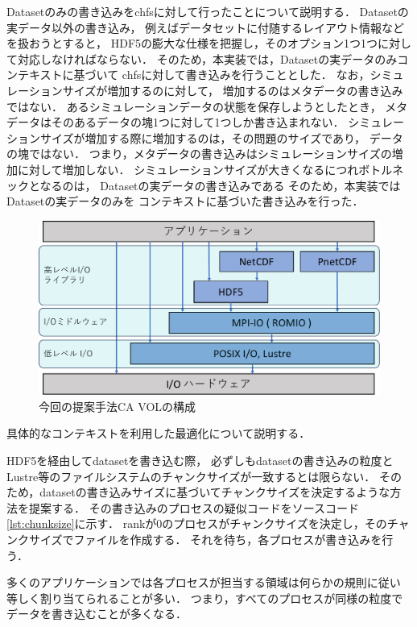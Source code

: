 \documentclass[submit,techrep,noauthor]{ipsj}
\begin{document}
Datasetのみの書き込みをchfsに対して行ったことについて説明する．
Datasetの実データ以外の書き込み，
例えばデータセットに付随するレイアウト情報などを扱おうとすると，
HDF5の膨大な仕様を把握し，そのオプション1つ1つに対して対応しなければならない．
そのため，本実装では，Datasetの実データのみコンテキストに基づいて
chfsに対して書き込みを行うこととした．
なお，シミュレーションサイズが増加するのに対して，
増加するのはメタデータの書き込みではない．
あるシミュレーションデータの状態を保存しようとしたとき，
メタデータはそのあるデータの塊1つに対して1つしか書き込まれない．
シミュレーションサイズが増加する際に増加するのは，その問題のサイズであり，
データの塊ではない．
つまり，メタデータの書き込みはシミュレーションサイズの増加に対して増加しない．
シミュレーションサイズが大きくなるにつれボトルネックとなるのは，
Datasetの実データの書き込みである
そのため，本実装ではDatasetの実データのみを
コンテキストに基づいた書き込みを行った．

\begin{figure}[tbp]
	\centering
	\includegraphics[page=8,width=\linewidth]{figure-crop.pdf}
	\caption{今回の提案手法CA VOLの構成}
	\label{fig:dividevol}
\end{figure}

具体的なコンテキストを利用した最適化について説明する．

HDF5を経由してdatasetを書き込む際，
必ずしもdatasetの書き込みの粒度とLustre等のファイルシステムのチャンクサイズが一致するとは限らない．
そのため，datasetの書き込みサイズに基づいてチャンクサイズを決定するような方法を提案する．
その書き込みのプロセスの疑似コードをソースコード\ref{lst:chunksize}に示す．
rankが0のプロセスがチャンクサイズを決定し，そのチャンクサイズでファイルを作成する．
それを待ち，各プロセスが書き込みを行う．

多くのアプリケーションでは各プロセスが担当する領域は何らかの規則に従い
等しく割り当てられることが多い．
つまり，すべてのプロセスが同様の粒度でデータを書き込むことが多くなる．
\end{document}
